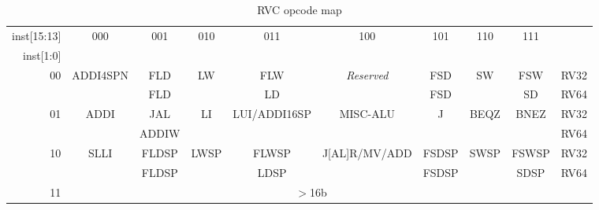 \vspace{0.1in}
\begin{table*}[htbp]
\begin{center}
{\footnotesize
\setlength{\tabcolsep}{4pt}
\begin{tabular}{|r|c|c|c|c|c|c|c|c|l}
  \cline{1-9}
  inst[15:13] & \multirow{2}{*}{000}& \multirow{2}{*}{001}& \multirow{2}{*}{010}& \multirow{2}{*}{011}& \multirow{2}{*}{100}& \multirow{2}{*}{101}& \multirow{2}{*}{110}& \multirow{2}{*}{111}\\ \cline{1-1}
  inst[1:0] & & & & & & & & \\ \cline{1-9}
    \multirow{2}{*}{00} & \multirow{2}{*}{ADDI4SPN} & FLD   & \multirow{2}{*}{LW}   & FLW                           & \multirow{2}{*}{\em Reserved}  & FSD                & \multirow{2}{*}{SW}   & FSW                   & RV32  \\
                        &                           & FLD   &                       & LD                            &                                & FSD                &                       & SD                    & RV64  \\ \hline
    \multirow{2}{*}{01} & \multirow{2}{*}{ADDI}     & JAL   & \multirow{2}{*}{LI}   & \multirow{2}{*}{LUI/ADDI16SP} & \multirow{2}{*}{MISC-ALU}      & \multirow{2}{*}{J} & \multirow{2}{*}{BEQZ} & \multirow{2}{*}{BNEZ} & RV32  \\
                        &                           & ADDIW &                       &                               &                                &                    &                       &                       & RV64  \\ \hline
    \multirow{2}{*}{10} & \multirow{2}{*}{SLLI}     & FLDSP & \multirow{2}{*}{LWSP} & FLWSP                         & \multirow{2}{*}{J[AL]R/MV/ADD} & FSDSP              & \multirow{2}{*}{SWSP} & FSWSP                 & RV32  \\
                        &                           & FLDSP &                       & LDSP                          &                                & FSDSP              &                       & SDSP                  & RV64  \\ \cline{1-9}
    \cellcolor{gray} 11  & \multicolumn{8}{c|}{\cellcolor{gray} $>$16b} \\ \cline{1-9}
 \end{tabular}
}
\end{center}
\vspace{-0.15in}
\caption{RVC opcode map}
\label{rvcopcodemap}
\end{table*}
